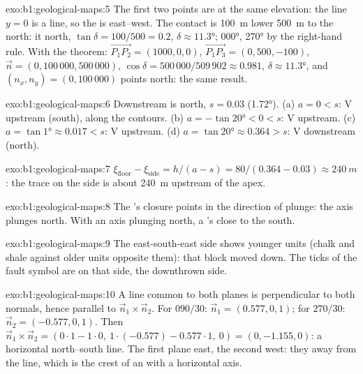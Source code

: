 \begin{solution}{exo:b1:geological-maps:5}
The first two points are at the same elevation: the line $y = 0$ is a 
line, so the  is east--west. The contact is \qty{100}{m} lower
\qty{500}{m} to the north: it  north, $\tan\delta = 100/500 = 0.2$,
$\delta \approx \ang{11.3}$;  \ang{000},  \ang{270} by the
right-hand rule. With the theorem: $\overrightarrow{P_1P_2} = (1000, 0, 0)$,
$\overrightarrow{P_1P_3} = (0, 500, -100)$, $\vec n = (0, 100\,000,
500\,000)$, $\cos\delta = 500\,000/509\,902 \approx 0.981$, $\delta \approx
\ang{11.3}$, and $(n_x, n_y) = (0, 100\,000)$ points north: the same result.
\end{solution}

\begin{solution}{exo:b1:geological-maps:6}
Downstream is north, $s = 0.03$ (\ang{1.72}). (a) $a = 0 < s$: V upstream
(south), along the contours. (b) $a = -\tan\ang{20} < 0 < s$: V upstream.
(c) $a = \tan\ang{1} \approx 0.017 < s$: V upstream. (d) $a = \tan\ang{20}
\approx 0.364 > s$: V downstream (north).
\end{solution}

\begin{solution}{exo:b1:geological-maps:7}
$\xi_{\text{floor}} - \xi_{\text{side}} = h/(a - s) = 80/(0.364 - 0.03)
\approx \qty{240}{m}$: the trace on the side is about \qty{240}{m} upstream of
the apex.
\end{solution}

\begin{solution}{exo:b1:geological-maps:8}
The 's closure points in the direction of plunge: the axis plunges
north. With an axis plunging north, a 's  close to the
south.
\end{solution}

\begin{solution}{exo:b1:geological-maps:9}
The east-south-east side shows younger units (chalk and shale against older
units opposite them): that block moved down. The ticks of the fault symbol
are on that side, the downthrown side.
\end{solution}

\begin{solution}{exo:b1:geological-maps:10}
A line common to both planes is perpendicular to both normals, hence
parallel to $\vec n_1 \times \vec n_2$. For $090/30$: $\vec n_1 = (0.577, 0,
1)$; for $270/30$: $\vec n_2 = (-0.577, 0, 1)$. Then $\vec n_1 \times \vec n_2
= (0\cdot 1 - 1\cdot 0,\ 1\cdot(-0.577) - 0.577\cdot 1,\ 0) = (0, -1.155,
0)$: a horizontal north--south line. The first plane  east, the second
west: they  away from the line, which is the crest of an  with a
horizontal axis.
\end{solution}

